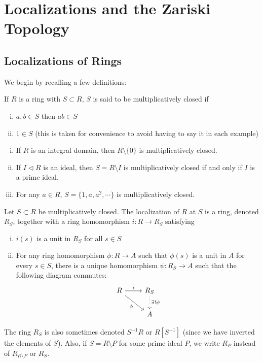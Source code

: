 \newpage
\section{Localizations and the Zariski Topology}
\subsection{Localizations of Rings}


We begin by recalling a few definitions:


\begin{dfn}
If $R$ is a ring with $S \subset R$, $S$ is said to be multiplicatively closed if
	\begin{enumerate}[(i)]
	\item $a,b \in S$ then $ab \in S$
	\item $1 \in S$ (this is taken for convenience to avoid having to say it in each example)
	\end{enumerate}
\end{dfn}


\begin{ex} \hfill
\begin{enumerate}[(i)]
	\item If $R$ is an integral domain, then $R \setminus \{0\}$ is multiplicatively closed.
	\item If $I \lhd R$ is an ideal, then $S=R\setminus I$ is multiplicatively closed if and only if $I$ is a prime ideal. 
	\item For any $a \in R$, $S=\{1,a,a^2,\cdots\}$ is multiplicatively closed. 
	\end{enumerate}
\end{ex}


\begin{dfn}[Localization]
Let $S \subset R$ be multiplicatively closed. The localization of $R$ at $S$ is a ring, denoted $R_S$, together with a ring homomorphism $i: R \to R_S$ satisfying
	\begin{enumerate}[(i)]
	\item $i(s)$ is a unit in $R_S$ for all $s \in S$
	\item For any ring homomorphism $\phi: R \to A$ such that $\phi(s)$ is a unit in $A$ for every $s \in S$, there is a unique homomorphism $\psi: R_S \to A$ such that the following diagram commutes:
	\[
	\begin{tikzcd}
	R \arrow{r}{i} \arrow[swap]{dr}{\phi} & R_S \arrow[dotted]{d}{\exists! \psi} \\
	& A
	\end{tikzcd}
	\]
\end{enumerate}
The ring $R_S$ is also sometimes denoted $S^{-1}R$ or $R[S^{-1}]$ (since we have inverted the elements of $S$). Also, if $S=R\setminus P$ for some prime ideal $P$, we write $R_P$ instead of $R_{R \setminus P}$ or $R_S$. 
\end{dfn}


